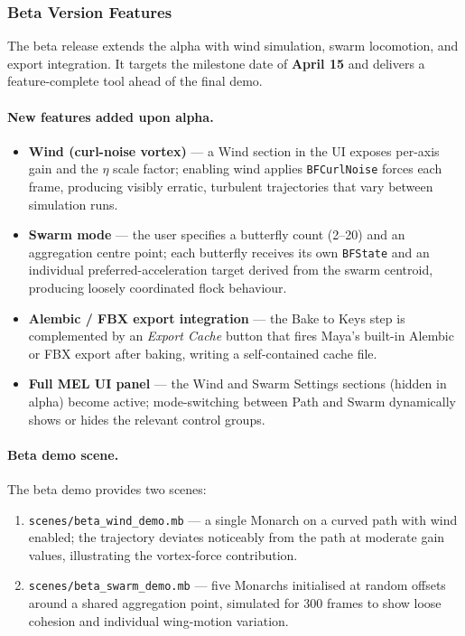 \documentclass[12pt]{article}
\begin{document}
\subsubsection{Beta Version Features}

The beta release extends the alpha with wind simulation, swarm locomotion, and
export integration. It targets the milestone date of \textbf{April 15} and
delivers a feature-complete tool ahead of the final demo.

\paragraph{New features added upon alpha.}
\begin{itemize}
  \item \textbf{Wind (curl-noise vortex)} --- a Wind section in the UI exposes
    per-axis gain and the $\eta$ scale factor; enabling wind applies
    \texttt{BFCurlNoise} forces each frame, producing visibly erratic, turbulent
    trajectories that vary between simulation runs.
  \item \textbf{Swarm mode} --- the user specifies a butterfly count (2--20) and
    an aggregation centre point; each butterfly receives its own \texttt{BFState}
    and an individual preferred-acceleration target derived from the swarm
    centroid, producing loosely coordinated flock behaviour.
  \item \textbf{Alembic / FBX export integration} --- the Bake to Keys step is
    complemented by an \textit{Export Cache} button that fires Maya's built-in
    Alembic or FBX export after baking, writing a self-contained cache file.
  \item \textbf{Full MEL UI panel} --- the Wind and Swarm Settings
    sections (hidden in alpha) become active; mode-switching between Path and Swarm
    dynamically shows or hides the relevant control groups.
\end{itemize}

\paragraph{Beta demo scene.}
The beta demo provides two scenes:
\begin{enumerate}
  \item \texttt{scenes/beta\_wind\_demo.mb} --- a single Monarch on a curved path
    with wind enabled; the trajectory deviates noticeably from the path at moderate
    gain values, illustrating the vortex-force contribution.
  \item \texttt{scenes/beta\_swarm\_demo.mb} --- five Monarchs initialised at
    random offsets around a shared aggregation point, simulated for 300 frames to
    show loose cohesion and individual wing-motion variation.
\end{enumerate}
\end{document}

